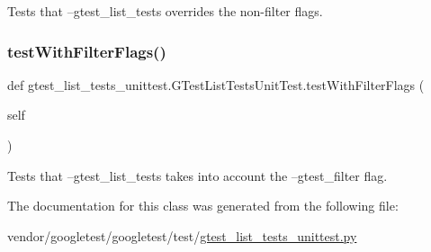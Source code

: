 \begin{DoxyVerb}Tests that --gtest_list_tests overrides the non-filter flags.\end{DoxyVerb}
 \mbox{\label{classgtest__list__tests__unittest_1_1_g_test_list_tests_unit_test_ac5bef6c9fb78b8eef84427de811fd70f}} 
\subsubsection{\texorpdfstring{test\+With\+Filter\+Flags()}{testWithFilterFlags()}}
{\footnotesize\ttfamily def gtest\+\_\+list\+\_\+tests\+\_\+unittest.\+G\+Test\+List\+Tests\+Unit\+Test.\+test\+With\+Filter\+Flags (\begin{DoxyParamCaption}\item[{}]{self }\end{DoxyParamCaption})}

\begin{DoxyVerb}Tests that --gtest_list_tests takes into account the
--gtest_filter flag.\end{DoxyVerb}
 

The documentation for this class was generated from the following file\+:\begin{DoxyCompactItemize}
\item 
vendor/googletest/googletest/test/\hyperlink{gtest__list__tests__unittest_8py}{gtest\+\_\+list\+\_\+tests\+\_\+unittest.\+py}\end{DoxyCompactItemize}
